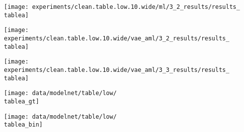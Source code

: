 {\begin{minipage}[t]{0.10\textwidth}
\end{minipage}
\begin{minipage}[t]{0.10\textwidth}
    \vspace{0px}\centering
    \texttt{[image: experiments/clean.table.low.10.wide/ml/3\_2\_results/results\_\\tablea]}
\end{minipage}
\begin{minipage}[t]{0.10\textwidth}
	\vspace{0px}\centering
	\texttt{[image: experiments/clean.table.low.10.wide/vae\_aml/3\_2\_results/results\_\\tablea]}
\end{minipage}
\begin{minipage}[t]{0.10\textwidth}
	\vspace{0px}\centering
	\texttt{[image: experiments/clean.table.low.10.wide/vae\_aml/3\_3\_results/results\_\\tablea]}
\end{minipage}
\begin{minipage}[t]{0.10\textwidth}
	\vspace{0px}\centering
	\texttt{[image: data/modelnet/table/low/\\tablea\_gt]}
\end{minipage}
\begin{minipage}[t]{0.10\textwidth}
	\vspace{0px}\centering
	\texttt{[image: data/modelnet/table/low/\\tablea\_bin]}
\end{minipage}
}